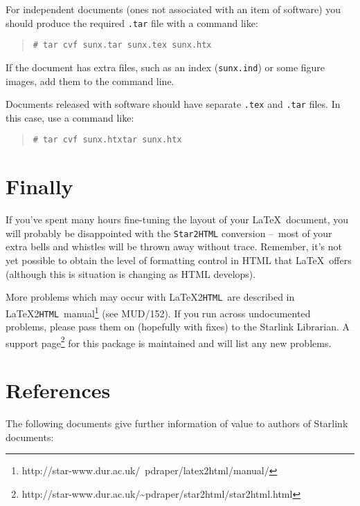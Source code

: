 \documentclass[twoside,11pt]{article}
\newcommand{\htmladdnormallinkfoot}[2]{#1\footnote{#2}}
\newcommand{\htmladdnormallink}[2]{#1}
\newcommand{\latex}[1]{#1}
\newcommand{\xlabel}[1]{}
\newcommand{\latextohtml}{\LaTeX2\texttt{HTML}}
\renewcommand{\_}{\texttt{\symbol{95}}}
\newcommand{\dash}{--}
\newcommand{\dash}{-}
\newcommand{\LtoHManURL}{http://star-www.dur.ac.uk/~{}pdraper/latex2html/manual/}
\newcommand{\supportURL}{http://star-www.dur.ac.uk/\~{}pdraper/star2html/star2html.html}
\begin{document}
For independent documents (ones not associated with an item of software) you
should produce the required \texttt{.tar} file with a command like:

\begin{quote}
\texttt{\# tar cvf sunx.tar sunx.tex sunx.htx}
\end{quote}

If the document has extra files, such as an index (\texttt{sunx.ind}) or some
figure images, add them to the command line.

Documents released with software should have separate \texttt{.tex} and
\texttt{.tar} files.
In this case, use a command like:

\begin{quote}
\texttt{\# tar cvf sunx.htx\_tar sunx.htx}
\end{quote}

\section{\xlabel{finally}Finally}

If you've spent many hours fine-tuning the layout of your \LaTeX\
document, you will probably be disappointed with the
\texttt{Star2HTML} conversion \dash\ most of your extra bells and
whistles will be thrown away without trace.  Remember, it's not yet
possible to obtain the level of formatting control in HTML that
\LaTeX\ offers (although this is situation is changing as HTML
develops).

More problems which may occur with \latextohtml\ are described in
\htmladdnormallinkfoot{\latextohtml\ manual}{\LtoHManURL}\latex{ (see
MUD/152)}.  If you run across undocumented problems, please pass them
on (hopefully with fixes) to the
\htmladdnormallink{Starlink Librarian}{mailto:ussc@star.rl.ac.uk}.
A \htmladdnormallinkfoot{support page}{\supportURL} for this
package is maintained and will list any new problems.

\section{\xlabel{references}References}

The following documents give further information of value to authors of
Starlink documents:
\end{document}
